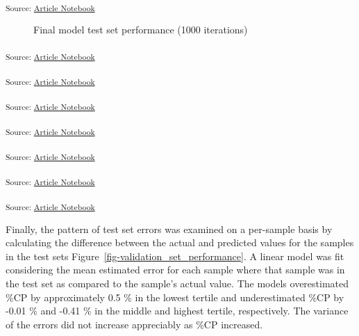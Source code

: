 \documentclass[
]{agujournal2019}
\begin{document}
\textsubscript{Source:
\href{https://rvcrawford.github.io/glowing-system/index.qmd.html}{Article
Notebook}}

\label{cell-fig-final-metric-boxplot}
\begin{figure}[H]


\caption{\label{fig-final-metric-boxplot}Final model test set
performance (1000 iterations)}

\end{figure}%

\textsubscript{Source:
\href{https://rvcrawford.github.io/glowing-system/index.qmd.html}{Article
Notebook}}

\textsubscript{Source:
\href{https://rvcrawford.github.io/glowing-system/index.qmd.html}{Article
Notebook}}

\textsubscript{Source:
\href{https://rvcrawford.github.io/glowing-system/index.qmd.html}{Article
Notebook}}

\textsubscript{Source:
\href{https://rvcrawford.github.io/glowing-system/index.qmd.html}{Article
Notebook}}

\textsubscript{Source:
\href{https://rvcrawford.github.io/glowing-system/index.qmd.html}{Article
Notebook}}

\textsubscript{Source:
\href{https://rvcrawford.github.io/glowing-system/index.qmd.html}{Article
Notebook}}

\textsubscript{Source:
\href{https://rvcrawford.github.io/glowing-system/index.qmd.html}{Article
Notebook}}

Finally, the pattern of test set errors was examined on a per-sample
basis by calculating the difference between the actual and predicted
values for the samples in the test sets
Figure~\ref{fig-validation_set_performance}. A linear model was fit
considering the mean estimated error for each sample where that sample
was in the test set as compared to the sample's actual value. The models
overestimated \%CP by approximately 0.5 \% in the lowest tertile and
underestimated \%CP by -0.01 \% and -0.41 \% in the middle and highest
tertile, respectively. The variance of the errors did not increase
appreciably as \%CP increased.
\end{document}

